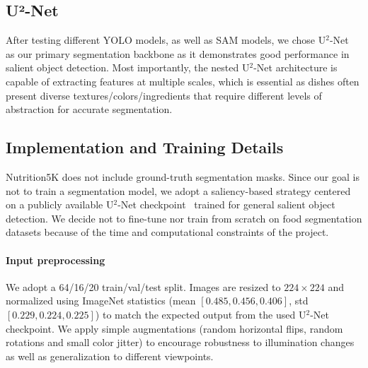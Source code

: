 \documentclass[a4paper]{article}
\begin{document}
        \clearpage

        \subsection{U²-Net}
        After testing different YOLO \cite{redmon2016yolo} models, as well as SAM \cite{kirillov2023sam} models, we chose U$^2$-Net~\cite{qin2020u2net} as our primary segmentation backbone as it demonstrates good performance in salient object detection. Most importantly, the nested U$^2$-Net architecture is capable of extracting features at multiple scales, which is essential as dishes often present diverse textures/colors/ingredients that require different levels of abstraction for accurate segmentation.
        
        \subsection{Implementation and Training Details}
        Nutrition5K does not include ground-truth segmentation masks. Since our goal is not to train a segmentation model, we adopt a saliency-based strategy centered on a publicly available U$^2$-Net checkpoint~\cite{qin2020u2net} trained for general salient object detection. We decide not to fine-tune nor train from scratch on food segmentation datasets because of the time and computational constraints of the project.
        
        \paragraph{Input preprocessing}
        We adopt a 64/16/20 train/val/test split. Images are resized to $224\times224$ and normalized using ImageNet statistics (mean $[0.485, 0.456, 0.406]$, std $[0.229, 0.224, 0.225]$) to match the expected output from the used U$^2$-Net checkpoint. We apply simple augmentations (random horizontal flips, random rotations and small color jitter) to encourage robustness to illumination changes as well as generalization to different viewpoints.
\end{document}

